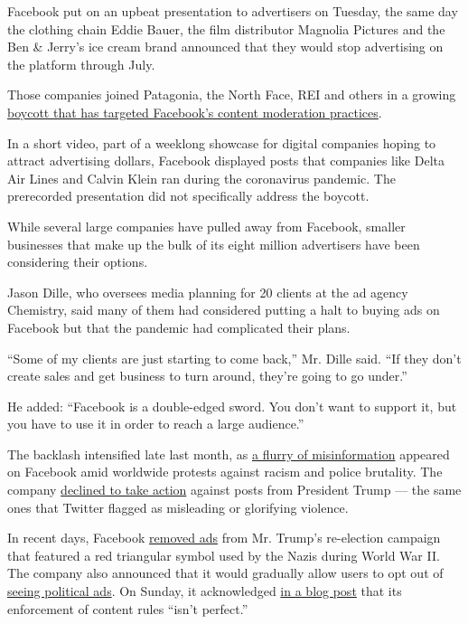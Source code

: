 Facebook put on an upbeat presentation to advertisers on Tuesday, the
same day the clothing chain Eddie Bauer, the film distributor Magnolia
Pictures and the Ben \& Jerry's ice cream brand announced that they
would stop advertising on the platform through July.

Those companies joined Patagonia, the North Face, REI and others in a
growing
\href{https://www.nytimes3xbfgragh.onion/2020/07/07/technology/facebook-ad-boycott-civil-rights.html}{boycott
that has targeted Facebook's content moderation practices}.

In a short video, part of a weeklong showcase for digital companies
hoping to attract advertising dollars, Facebook displayed posts that
companies like Delta Air Lines and Calvin Klein ran during the
coronavirus pandemic. The prerecorded presentation did not specifically
address the boycott.

While several large companies have pulled away from Facebook, smaller
businesses that make up the bulk of its eight million advertisers have
been considering their options.

Jason Dille, who oversees media planning for 20 clients at the ad agency
Chemistry, said many of them had considered putting a halt to buying ads
on Facebook but that the pandemic had complicated their plans.

``Some of my clients are just starting to come back,'' Mr. Dille said.
``If they don't create sales and get business to turn around, they're
going to go under.''

He added: ``Facebook is a double-edged sword. You don't want to support
it, but you have to use it in order to reach a large audience.''

The backlash intensified late last month, as
\href{https://www.nytimes3xbfgragh.onion/2020/06/22/technology/antifa-local-disinformation.html}{a
flurry of misinformation} appeared on Facebook amid worldwide protests
against racism and police brutality. The company
\href{https://www.nytimes3xbfgragh.onion/2020/05/29/technology/twitter-facebook-zuckerberg-trump.html}{declined
to take action} against posts from President Trump --- the same ones
that Twitter flagged as misleading or glorifying violence.

In recent days, Facebook
\href{https://www.nytimes3xbfgragh.onion/2020/06/18/us/politics/facebook-trump-ads-antifa-red-triangle.html}{removed
ads} from Mr. Trump's re-election campaign that featured a red
triangular symbol used by the Nazis during World War II. The company
also announced that it would gradually allow users to opt out of
\href{https://www.nytimes3xbfgragh.onion/2020/06/16/technology/opt-out-political-ads-facebook.html}{seeing
political ads}. On Sunday, it acknowledged
\href{https://www.facebookcorewwwi.onion/business/news/where-facebook-stands-racial-equality-justice}{in
a blog post} that its enforcement of content rules ``isn't perfect.''

